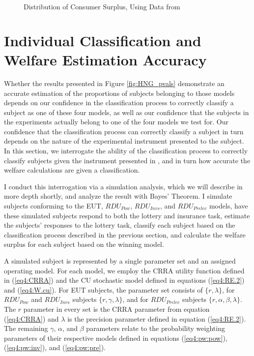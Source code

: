 \documentclass[../main.tex]{subfiles}
\begin{document}
\begin{figure}[h!]
	\center
	\caption{Distribution of Consumer Surplus, Using Data from \textcite{Harrison2016}}
	\label{fig:HNG_CS}
\end{figure}

\section{Individual Classification and Welfare Estimation Accuracy}
\label{sec4:IC}

Whether the results presented in Figure \ref{fig:HNG_pvals} demonstrate an accurate estimation of the proportions of subjects belonging to those models depends on our confidence in the classification process to correctly classify a subject as one of these four models, as well as our confidence that the subjects in the experiments actually belong to one of the four models we test for.
Our confidence that the classification process can correctly classify a subject in turn depends on the nature of the experimental instrument presented to the subject.
In this section, we interrogate the ability of the classification process to correctly classify subjects given the instrument presented in \textcite{Harrison2016}, and in turn how accurate the welfare calculations are given a classification.

I conduct this interrogation via a simulation analysis, which we will describe in more depth shortly, and analyze the result with Bayes' Theorem.
I simulate subjects conforming to the EUT, $\mathit{RDU_{Pow}}$, $\mathit{RDU_{Invs}}$, and $\mathit{RDU_{Prelec}}$ models, have these simulated subjects respond to both the lottery and insurance task, estimate the subjects' responses to the lottery task, classify each subject based on the classification process described in the previous section, and calculate the welfare surplus for each subject based on the winning model.

A simulated subject is represented by a single parameter set and an assigned operating model.
For each model, we employ the CRRA utility function defined in (\ref{eq4:CRRA}) and the CU stochastic model defined in equations (\ref{eq4:RE.2}) and (\ref{eq4:W.cu}).
For EUT subjects, the parameter set consists of $\lbrace r, \lambda \rbrace$, for $\mathit{RDU_{Pow}}$ and $\mathit{RDU_{Invs}}$ subjects $\lbrace r, \gamma, \lambda \rbrace$, and for $\mathit{RDU_{Prelec}}$ subjects $\lbrace r, \alpha, \beta, \lambda \rbrace$.
The $r$ parameter in every set is the CRRA parameter from equation (\ref{eq4:CRRA}) and $\lambda$ is the precision parameter defined in equation (\ref{eq4:RE.2}).
The remaining $\gamma$, $\alpha$, and $\beta$ parameters relate to the probability weighting parameters of their respective models defined in equations (\ref{eq4:pw:pow}), (\ref{eq4:pw:inv}), and (\ref{eq4:pw:pre}).
\end{document}
